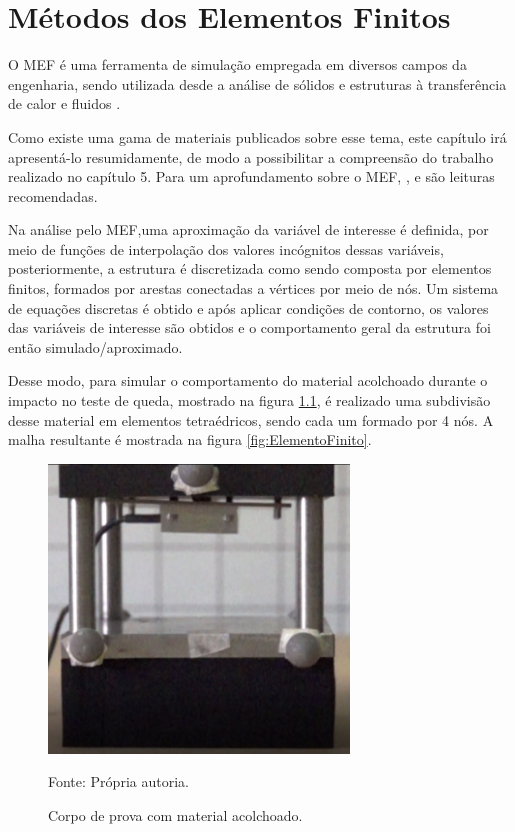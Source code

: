 \chapter{Métodos dos Elementos Finitos}\label{cap:elementosfinitos}

O MEF é uma ferramenta de simulação empregada em diversos campos da engenharia, sendo utilizada desde a análise de sólidos e estruturas à transferência de calor e fluidos \cite{bathe2006finite}. 

Como existe uma gama de materiais publicados sobre esse tema, este capítulo irá apresentá-lo resumidamente, de modo a possibilitar a compreensão do trabalho realizado no capítulo 5. Para um aprofundamento sobre o MEF, \cite{bathe2006finite}, \cite{felippa2004introduction} e \cite{felippa2003advanced} são leituras recomendadas.

Na análise pelo MEF,uma aproximação da variável de interesse é definida, por meio de funções de interpolação dos valores incógnitos dessas variáveis, posteriormente, a estrutura é discretizada como sendo composta por elementos finitos, formados por arestas conectadas a vértices por meio de nós. Um sistema de equações discretas é obtido e após aplicar condições de contorno, os valores das variáveis de interesse são obtidos e o comportamento geral da estrutura foi então simulado/aproximado.

Desse modo, para simular o comportamento do material acolchoado durante o impacto no teste de queda, mostrado na figura \ref{fig:CorpoDeProva}, é realizado uma subdivisão desse material em elementos tetraédricos, sendo cada um formado por 4 nós. A malha resultante é mostrada na figura \ref{fig:ElementoFinito}. 

 \begin{figure}[H]  
        \centering
        \caption{Corpo de prova com material acolchoado.}
        \includegraphics[width=8cm]{./figs/CorpoDeProva.PNG}
        \par\medskip
        Fonte: Própria autoria.
        \label{fig:CorpoDeProva}
\end{figure}

